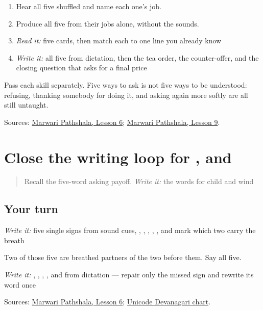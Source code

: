 \begin{enumerate}
\raggedright
  \item Hear all five shuffled and name each one's job.
  \item Produce all five from their jobs alone, without the sounds.
  \item \emph{Read it:} five cards, then match each to one line you already know
  \item \emph{Write it:} all five from dictation, then the tea order, the counter-offer, and the closing question that asks for a final price
\end{enumerate}

Pass each skill separately. Five ways to ask is not five ways to be understood: refusing, thanking somebody for doing it, and asking again more softly are all still untaught.

\begin{tcolorbox}[breakable,colback=teal!4,colframe=teal!35!black,title={Before you move on}]
Sources: \href{https://www.marwaripathshala.com/marwari-lesson-6-english}{Marwari Pathshala, Lesson 6}; \href{https://www.marwaripathshala.com/marwari-lesson-9-english}{Marwari Pathshala, Lesson 9}.
\end{tcolorbox}
\section[Practice]{Close the writing loop for ,  and }

\label{lesson:MW-R25-script-close}



\begin{quote}
Recall the five-word asking payoff. \emph{Write it:} the words for child and wind
\end{quote}

\subsection*{Your turn}
\emph{Write it:} five single signs from sound cues, \textbf{}, \textbf{}, \textbf{}, \textbf{}, \textbf{}, and mark which two carry the breath

Two of those five are breathed partners of the two before them. Say all five.

\emph{Write it:} \textbf{}, \textbf{}, \textbf{}, \textbf{ }, and \textbf{ } from dictation — repair only the missed sign and rewrite its word once

\begin{tcolorbox}[breakable,colback=teal!4,colframe=teal!35!black,title={Before you move on}]
Sources: \href{https://www.marwaripathshala.com/marwari-lesson-6-english}{Marwari Pathshala, Lesson 6}; \href{https://www.unicode.org/charts/PDF/U0900.pdf}{Unicode Devanagari chart}.
\end{tcolorbox}
